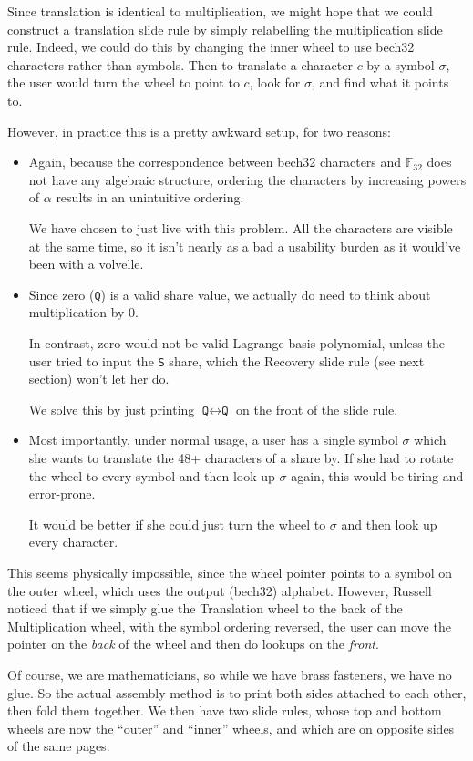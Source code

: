 \documentclass[letterpaper]{article}
\theoremstyle{xxx}
\theoremstyle{evil}
\theoremstyle{yyy}
\theoremstyle{plain}
\theoremstyle{zzz}
\newcommand{\fttwo}{\mathbb{F}_{32}}
\newcommand{\vc}[1]{\texttt{#1}} %
\begin{document}
Since translation is identical to multiplication, we might hope that we could
construct a translation slide rule by simply relabelling the multiplication
slide rule. Indeed, we could do this by changing the inner wheel to use
bech32 characters rather than symbols. Then to translate a character $c$ by
a symbol $\sigma$, the user would turn the wheel to point to $c$, look for
$\sigma$, and find what it points to.

However, in practice this is a pretty awkward setup, for two reasons:
\begin{itemize}
\item Again, because the correspondence between bech32 characters and $\fttwo$
does not have any algebraic structure, ordering the characters by increasing
powers of $\alpha$ results in an unintuitive ordering.

We have chosen to just live with this problem. All the characters are visible
at the same time, so it isn't nearly as a bad a usability burden as it would've
been with a volvelle.
\item Since zero (\vc{Q}) is a valid share value, we actually do need to think
about multiplication by 0.

In contrast, zero would not be valid Lagrange basis polynomial, unless the user
tried to input the \vc{S} share, which the Recovery slide rule (see next section)
won't let her do.

We solve this by just printing $\vc{Q}\leftrightarrow\vc{Q}$ on the front of
the slide rule.
\item Most importantly, under normal usage, a user has a single symbol $\sigma$
which she wants to translate the 48+ characters of a share by. If she had to
rotate the wheel to every symbol and then look up $\sigma$ again, this would
be tiring and error-prone.

It would be better if she could just turn the wheel to $\sigma$ and then look
up every character.
\end{itemize}

This seems physically impossible, since the wheel pointer points to a symbol
on the outer wheel, which uses the output (bech32) alphabet. However, Russell
noticed that if we simply glue the Translation wheel to the back of the
Multiplication wheel, with the symbol ordering reversed, the user can move
the pointer on the \emph{back} of the wheel and then do lookups on the
\emph{front}.

Of course, we are mathematicians, so while we have brass fasteners, we have
no glue. So the actual assembly method is to print both sides attached to
each other, then fold them together. We then have two slide rules, whose
top and bottom wheels are now the ``outer'' and ``inner'' wheels, and which
are on opposite sides of the same pages.
\end{document}
